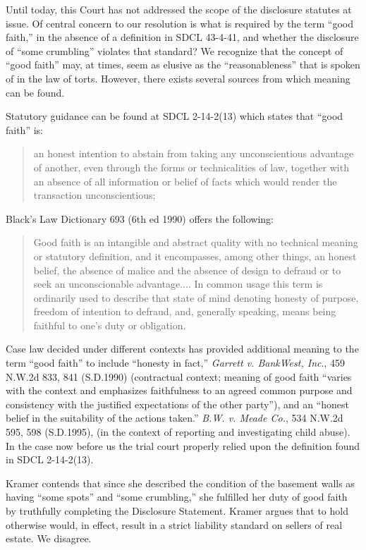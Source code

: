 Until today, this Court has not addressed the scope of the disclosure statutes
at issue. Of central concern to our resolution is what is required by the term
``good faith,'' in the absence of a definition in SDCL 43-4-41, and whether the
disclosure of ``some crumbling'' violates that standard? We recognize that the
concept of ``good faith'' may, at times, seem as elusive as the
``reasonableness'' that is spoken of in the law of torts. However, there exists
several sources from which meaning can be found.

Statutory guidance can be found at SDCL 2-14-2(13) which states that ``good
faith'' is:
\begin{quote}
an honest intention to abstain from taking any unconscientious advantage of
another, even through the forms or technicalities of law, together with an
absence of all information or belief of facts which would render the
transaction unconscientious;
\end{quote}

Black's Law Dictionary 693 (6th ed 1990) offers the following:
\begin{quote}
Good faith is an intangible and abstract quality with no technical meaning or
statutory definition, and it encompasses, among other things, an honest belief,
the absence of malice and the absence of design to defraud or to seek an
unconscionable advantage.... In common usage this term is ordinarily used to
describe that state of mind denoting honesty of purpose, freedom of intention
to defraud, and, generally speaking, means being faithful to one's duty or
obligation.
\end{quote}

Case law decided under different contexts has provided additional meaning to the
term ``good faith'' to include ``honesty in fact,'' \textit{Garrett v.
BankWest, Inc}., 459 N.W.2d 833, 841 (S.D.1990) (contractual context; meaning
of good faith ``varies with the context and emphasizes faithfulness to an
agreed common purpose and consistency with the justified expectations of the
other party''), and an ``honest belief in the suitability of the actions
taken.'' \textit{B.W. v. Meade Co.}, 534 N.W.2d 595, 598 (S.D.1995), (in the
context of reporting and investigating child abuse). In the case now before us
the trial court properly relied upon the definition found in SDCL 2-14-2(13).

Kramer contends that since she described the condition of the basement walls as
having ``some spots'' and ``some crumbling,'' she fulfilled her duty of good
faith by truthfully completing the Disclosure Statement. Kramer argues that to
hold otherwise would, in effect, result in a strict liability standard on
sellers of real estate. We disagree.

